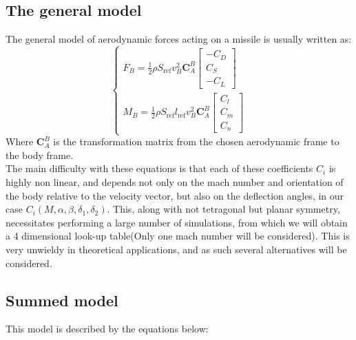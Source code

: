 \subsection{The general model}
The general model of aerodynamic forces acting on a missile is usually written as:
\begin{equation}
    \begin{cases}
        
        F_B = \frac{1}{2}\rho S_{\text{ref}}v_B^{2}\mathbf{C}^{B}_A \begin{bmatrix}
            -C_D \\
            C_S\\
            -C_L
        \end{bmatrix}
        \\
        M_B = \frac{1}{2}\rho S_{\text{ref}}l_{\text{ref}}v_B^{2}\mathbf{C}^{B}_A \begin{bmatrix}
            C_l \\
            C_m\\
            C_n
        \end{bmatrix}

    \end{cases}
\end{equation}
Where $\mathbf{C}^{B}_A$ is the transformation matrix from the chosen aerodynamic frame to the body frame. \\
The main difficulty with these equations is that each of these coefficients $C_i$ is highly non linear, and depends not only on the mach number and orientation of the body relative to the velocity vector, but also on the deflection angles, in our case  $C_i(M,\alpha,\beta,\delta_1,\delta_2)$. This, along with not tetragonal but planar symmetry, necessitates performing a large number of simulations, from which we will obtain a 4 dimensional look-up table(Only one mach number will be considered). This is very unwieldy in theoretical applications, and as such several alternatives will be considered.

\subsection{Summed model}
This model is described by the equations below:

